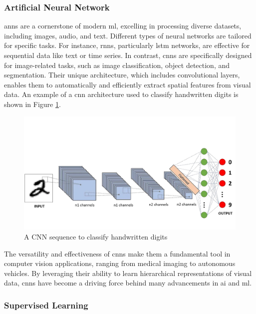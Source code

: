 \subsubsection*{Artificial Neural Network}
\label{subsubsec:artificial-neural-network}

\glspl{ann} are a cornerstone of modern \gls{ml}, excelling in processing diverse datasets, including images, audio, and text. Different types of neural networks are tailored for specific tasks. For instance, \glspl{rnn}, particularly \gls{lstm} networks, are effective for sequential data like text or time series. In contrast, \glspl{cnn} are specifically designed for image-related tasks, such as image classification, object detection, and segmentation. Their unique architecture, which includes convolutional layers, enables them to automatically and efficiently extract spatial features from visual data. An example of a \gls{cnn} architecture used to classify handwritten digits is shown in Figure \ref{fig:convolutional-neural-network}. \cite{geeksforgeeks:cnn} \\

\begin{figure}[h!]
    \centering
    \includegraphics[width=0.75\linewidth]{figures/theory/convolutional-neural-network.png}
    \caption[A CNN sequence to classify handwritten digits]{A CNN sequence to classify handwritten digits \cite{medium:cnn}}
    \label{fig:convolutional-neural-network}
\end{figure}

The versatility and effectiveness of \glspl{cnn} make them a fundamental tool in computer vision applications, ranging from medical imaging to autonomous vehicles. By leveraging their ability to learn hierarchical representations of visual data, \glspl{cnn} have become a driving force behind many advancements in \gls{ai} and \gls{ml}.

\subsubsection*{Supervised Learning}
\label{subsubsec:supervised-learning}

